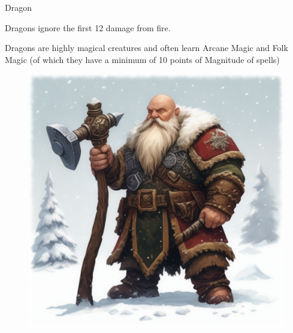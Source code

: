 \begin{monsterbox}{Dragon}
\begin{rpg-monsteraction}
	\end{rpg-monsteraction}
	\begin{rpg-monsteraction}
		Dragons ignore the first 12 damage from fire.
	\end{rpg-monsteraction}
	\begin{rpg-monsteraction}[Supernatural]
		Dragons are highly magical creatures and often learn Arcane Magic and Folk Magic (of which they have a minimum of 10 points of Magnitude of spells)
	\end{rpg-monsteraction}
\end{monsterbox}



\begin{figure}[h]
\begin{center}
\includegraphics[scale=0.24]{img/ai-images/dwarf.png}
\end{center}
\end{figure}
\label{creature:dwarf}

